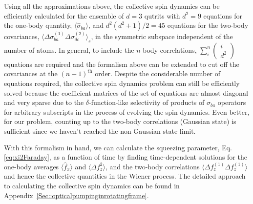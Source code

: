 \documentclass[preprint,aps,pra,onecolumn,superscriptaddress]{revtex4-1} %
\newcommand{\expect}[1]{\big\langle #1 \big\rangle}
\begin{document}
Using all the approximations above, the collective spin dynamics can be efficiently calculated for the ensemble of $d=3$  qutrits with $ d^2=9 $ equations for the one-body quantity, $ \expect{\hat{\sigma}_{ba}} $, and $ d^2(d^2+1)/2=45 $ equations for the two-body covariances, $ \expect{\Delta \sigma_{ba}^{(1)}\Delta\sigma_{dc}^{(2)} }_s $, in the symmetric subspace independent of the number of atoms.
In general, to include the $ n $-body correlations, $ \sum_i^n\left(\!\begin{array}{c}i\\d^2\end{array} \! \right) $ equations are required and the formalism above can be extended to cut off the covariances at the $ (n+1)^{\text{th}} $ order. Despite the considerable number of equations required, the collective spin dynamics problem can still be efficiently solved because the coefficient matrices of the set of equations are almost diagonal and very sparse due to the $ \delta $-function-like selectivity of products of $ \hat{\sigma}_{ba} $ operators for arbitrary subscripts in the process of evolving the spin dynamics. Even better, for our problem, counting up to the two-body correlations (Gaussian state) is sufficient since we haven't reached the non-Gaussian state limit.

With this formalism in hand, we can calculate the squeezing parameter, Eq.\eqref{eq:xi2Faraday}, as a function of time by finding time-dependent solutions for the one-body averages $\expect{\hat{f}_x}$ and  $\expect{\Delta f_z^2}$, and the two-body correlations $\expect{\Delta f_z^{(1)} \Delta f_z^{(1)}}$ and hence the collective quantities in the Wiener process.  The detailed approach to calculating the collective spin dynamics can be found in Appendix~\ref{Sec::opticalpumpinginrotatingframe}. 
\end{document}
